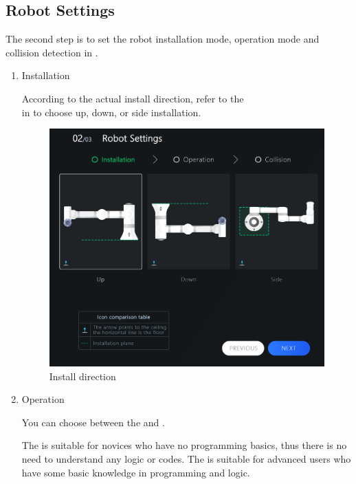 \subsection{Robot Settings}
The second step is to set the robot installation mode, operation mode and collision detection in .
\begin{enumerate}
\item Installation

	According to the actual install direction, refer to the \\ in  to choose up, down, or side installation.

	\begin{figure}[ht]
		\centering
		\includegraphics[width=\textwidth]{en/image/2-6.png}
		\caption{Install direction}
		\label{fig:安装方式}
	\end{figure}



\item Operation

	You can choose between the  and .
	
	The  is suitable for novices who have no programming basics, thus there is no need to understand any logic or codes. The  is suitable for advanced users who have some basic knowledge in programming and logic. 


\end{enumerate}
